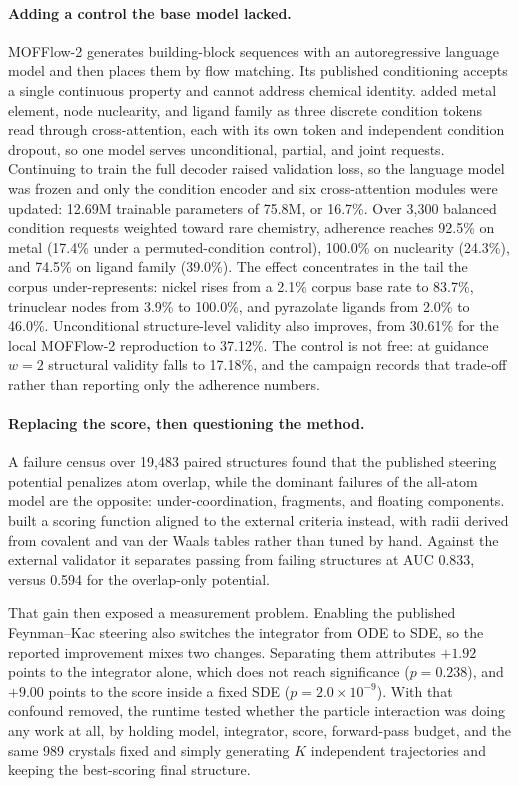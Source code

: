 \paragraph{Adding a control the base model lacked.} MOFFlow-2 generates
building-block sequences with an autoregressive language model and then places them
by flow matching. Its published conditioning accepts a single continuous property
and cannot address chemical identity. \systemname added metal element, node
nuclearity, and ligand family as three discrete condition tokens read through
cross-attention, each with its own  token and independent condition
dropout, so one model serves unconditional, partial, and joint requests. Continuing
to train the full decoder raised validation loss, so the language model was frozen
and only the condition encoder and six cross-attention modules were updated:
12.69M trainable parameters of 75.8M, or 16.7\%. Over 3{,}300 balanced condition
requests weighted toward rare chemistry, adherence reaches 92.5\% on metal
(17.4\% under a permuted-condition control), 100.0\% on nuclearity (24.3\%), and
74.5\% on ligand family (39.0\%). The effect concentrates in the tail the corpus
under-represents: nickel rises from a 2.1\% corpus base rate to 83.7\%, trinuclear
nodes from 3.9\% to 100.0\%, and pyrazolate ligands from 2.0\% to 46.0\%. Unconditional
structure-level validity also improves, from 30.61\% for the local MOFFlow-2
reproduction to 37.12\%. The control is not free: at guidance $w{=}2$ structural
validity falls to 17.18\%, and the campaign records that trade-off rather than
reporting only the adherence numbers.

\paragraph{Replacing the score, then questioning the method.} A failure census over
19{,}483 paired structures found that the published steering potential penalizes
atom overlap, while the dominant failures of the all-atom model are the opposite:
under-coordination, fragments, and floating components. \systemname built a scoring
function aligned to the external  criteria instead, with radii
derived from covalent and van der Waals tables rather than tuned by hand. Against
the external validator it separates passing from failing structures at
AUC 0.833, versus 0.594 for the overlap-only potential.

That gain then exposed a measurement problem. Enabling the published Feynman--Kac
steering also switches the integrator from ODE to SDE, so the reported improvement
mixes two changes. Separating them attributes $+1.92$ points to the integrator alone,
which does not reach significance ($p{=}0.238$), and $+9.00$ points to the score
inside a fixed SDE ($p{=}2.0\times10^{-9}$). With that confound removed, the runtime
tested whether the particle interaction was doing any work at all, by holding model,
integrator, score, forward-pass budget, and the same 989 crystals fixed and simply
generating $K$ independent trajectories and keeping the best-scoring final structure.

